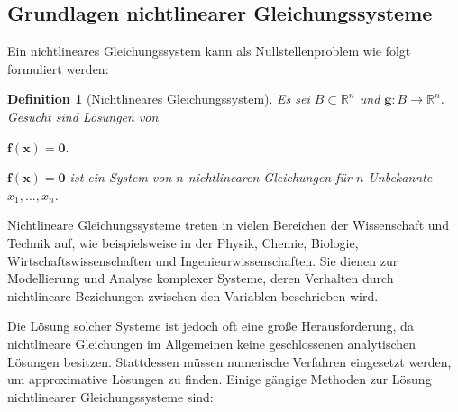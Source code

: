 \documentclass{article}
\theoremstyle{newline}
\newtheorem{definition}{Definition}[section]
\begin{document}
\begin{onehalfspace}
\begin{abstract}
	
\end{abstract}
\newpage


\tableofcontents	%
\thispagestyle{empty}

\newpage		

\section{Grundlagen nichtlinearer Gleichungssysteme}

Ein nichtlineares Gleichungssystem kann als Nullstellenproblem wie folgt formuliert werden:

\begin{definition}[Nichtlineares Gleichungssystem]
	Es sei $B \subset \mathbb{R}^n$ und $\mathbf{g}: B \rightarrow \mathbb{R}^n$. Gesucht sind Lösungen von
	
	\begin{center}
		$\mathbf{f}(\mathbf{x}) = \mathbf{0}.$
	\end{center}
	
	$\mathbf{f}(\mathbf{x}) = \mathbf{0}$ ist ein System von $n$ nichtlinearen Gleichungen für $n$ Unbekannte $x_1, \dots, x_n$.
	\\
	
	\begin{center}
	\end{center}
	
\end{definition}
\bigskip

Nichtlineare Gleichungssysteme treten in vielen Bereichen der Wissenschaft und Technik auf, wie beispielsweise in der Physik, Chemie, Biologie, Wirtschaftswissenschaften und Ingenieurwissenschaften. Sie dienen zur Modellierung und Analyse komplexer Systeme, deren Verhalten durch nichtlineare Beziehungen zwischen den Variablen beschrieben wird.

Die Lösung solcher Systeme ist jedoch oft eine große Herausforderung, da nichtlineare Gleichungen im Allgemeinen keine geschlossenen analytischen Lösungen besitzen. Stattdessen müssen numerische Verfahren eingesetzt werden, um approximative Lösungen zu finden. Einige gängige Methoden zur Lösung nichtlinearer Gleichungssysteme sind:


\end{onehalfspace}
\end{document}
